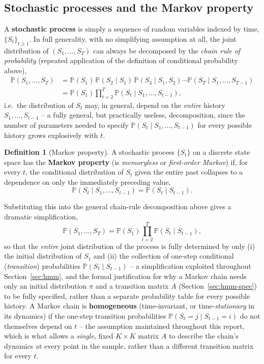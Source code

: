 \documentclass[11pt]{article}
\theoremstyle{definition}
\newtheorem{definition}[theorem]{Definition}
\theoremstyle{remark}
\begin{document}
\subsection{Stochastic processes and the Markov property}
\label{sec:markov-prelim}

A \textbf{stochastic process} is simply a sequence of random variables indexed by time, $\{S_t\}_{t\ge1}$. In full generality, with no simplifying assumption at all, the joint distribution of $(S_1,\dots,S_T)$ can always be decomposed by the \emph{chain rule of probability} (repeated application of the definition of conditional probability above),
\begin{align*}
\mathbb{P}(S_1,\dots,S_T) &= \mathbb{P}(S_1)\,\mathbb{P}(S_2\mid S_1)\,\mathbb{P}(S_3\mid S_1,S_2)\cdots\mathbb{P}(S_T\mid S_1,\dots,S_{T-1}) \\
&= \mathbb{P}(S_1)\prod_{t=2}^{T}\mathbb{P}(S_t\mid S_1,\dots,S_{t-1}),
\end{align*}
i.e.\ the distribution of $S_t$ may, in general, depend on the \emph{entire} history $S_1,\dots,S_{t-1}$ -- a fully general, but practically useless, decomposition, since the number of parameters needed to specify $\mathbb{P}(S_t\mid S_1,\dots,S_{t-1})$ for every possible history grows explosively with $t$.

\begin{definition}[Markov property]
A stochastic process $\{S_t\}$ on a discrete state space has the \textbf{Markov property} (is \emph{memoryless} or \emph{first-order Markov}) if, for every $t$, the conditional distribution of $S_t$ given the entire past collapses to a dependence on only the immediately preceding value,
\[
\mathbb{P}(S_t\mid S_1,\dots,S_{t-1}) = \mathbb{P}(S_t\mid S_{t-1}).
\]
\end{definition}
Substituting this into the general chain-rule decomposition above gives a dramatic simplification,
\[
\mathbb{P}(S_1,\dots,S_T) = \mathbb{P}(S_1)\prod_{t=2}^{T}\mathbb{P}(S_t\mid S_{t-1}),
\]
so that the \emph{entire} joint distribution of the process is fully determined by only (i) the initial distribution of $S_1$ and (ii) the collection of one-step conditional (\emph{transition}) probabilities $\mathbb{P}(S_t\mid S_{t-1})$ -- a simplification exploited throughout Section~\ref{sec:hmm}, and the formal justification for why a Markov chain needs only an initial distribution $\pi$ and a transition matrix $A$ (Section~\ref{sec:hmm-spec}) to be fully specified, rather than a separate probability table for every possible history. A Markov chain is \textbf{homogeneous} (time-invariant, or time-\emph{stationary} in its dynamics) if the one-step transition probabilities $\mathbb{P}(S_t=j\mid S_{t-1}=i)$ do not themselves depend on $t$ -- the assumption maintained throughout this report, which is what allows a \emph{single}, fixed $K\times K$ matrix $A$ to describe the chain's dynamics at every point in the sample, rather than a different transition matrix for every $t$.
\end{document}
